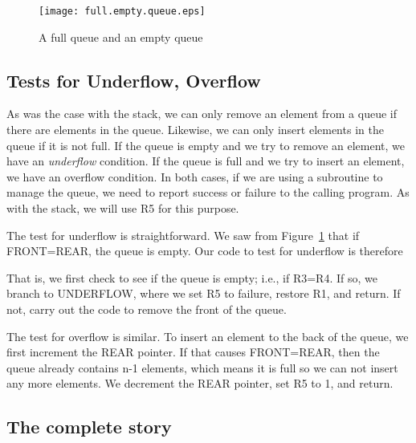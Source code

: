 \documentclass{patt}
\begin{document}
\begin{figure}[h]
\centerline{\texttt{[image: full.empty.queue.eps]}}
\caption{A full queue and an empty queue}
\label{fig:full.empty.queue}
\end{figure}

\FloatBarrier
\subsection{Tests for Underflow, Overflow}

As was the case with the stack, we can only remove an element from a queue if 
there are elements in the queue.  Likewise, we can only insert elements in the
queue if it is not full.  If the queue is empty and we try to remove an element,
we have an {\em underflow} condition.  If the queue is full and we try to
insert an element, we have an overflow condition.  In both cases, if we are
using a subroutine to manage the queue, we need to report success or failure 
to the calling program.  As with the stack, we will use R5 for this purpose.

The test for underflow is straightforward.  We saw from 
Figure~\ref{fig:full.empty.queue} that if FRONT=REAR, the queue is empty.  
Our code to test for underflow is therefore

 
\noindent
That is, we first check to see if the queue is empty; i.e., if R3=R4.  If so, 
we branch to UNDERFLOW, where we set R5 to failure, restore R1, and return.
If not, carry out the code to remove the front of the queue.
 
The test for overflow is similar.  To insert an element to the back of the
queue, we first increment the REAR pointer.  If that causes FRONT=REAR, then
the queue already contains n-1 elements, which means it is full so we can not 
insert any more elements.  We decrement the REAR pointer, set R5 to 1, and 
return.

\subsection{The complete story}
\end{document}
